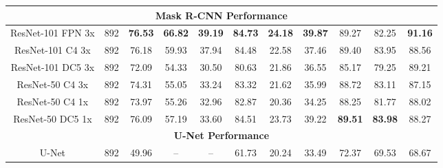 \documentclass[journal,article,submit,pdftex,moreauthors]{Definitions/mdpi}
\begin{document}
\begin{table}[t]
{\begin{tabular}{|c|c|c|c|c|c|c|c|c|c|c|}
\multicolumn{11}{|c|}{\textbf{Mask R-CNN Performance}} \\ \hline
ResNet-101 FPN 3x & 892 & \textbf{76.53} & \textbf{66.82} & \textbf{39.19} & \textbf{84.73} & \textbf{24.18} & \textbf{39.87} & 89.27 & 82.25 & \textbf{91.16} \\ \hline
ResNet-101 C4 3x & 892 & 76.18 & 59.93 & 37.94 & 84.48 & 22.58 & 37.46 & 89.40 & 83.95 & 88.56 \\ \hline
ResNet-101 DC5 3x & 892 & 72.09 & 54.33 & 30.50 & 80.63 & 21.86 & 36.55 & 85.17 & 79.25 & 89.21 \\ \hline
ResNet-50 C4 3x & 892 & 74.31 & 55.05 & 33.24 & 83.32 & 21.62 & 35.99 & 88.72 & 83.11 & 87.15 \\ \hline
ResNet-50 C4 1x & 892 & 73.97 & 55.26 & 32.96 & 82.87 & 20.36 & 34.25 & 88.25 & 81.77 & 88.02 \\ \hline
ResNet-50 DC5 1x & 892 & 76.09 & 57.19 & 33.60 & 84.51 & 23.73 & 39.22 & \textbf{89.51} & \textbf{83.98} & 88.27 \\ \hline

\multicolumn{11}{|c|}{\textbf{U-Net Performance}} \\ \hline
U-Net & 892 & 49.96 & -- & -- & 61.73 & 20.24 & 33.49 & 72.37 & 69.53 & 68.67 \\ \hline
\end{tabular}%
}
\end{table}
\end{document}
